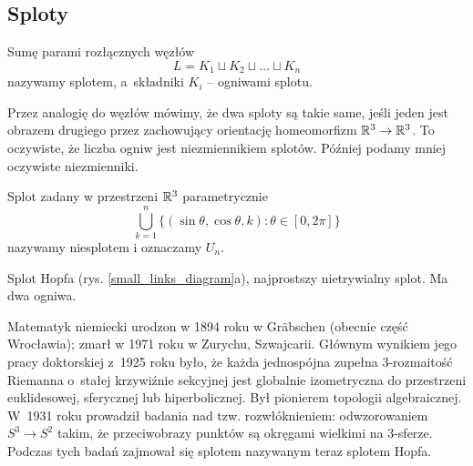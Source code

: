 
\subsection{Sploty}
\begin{definition}
%
    Sumę parami rozłącznych węzłów
    \begin{equation}
        L = K_1 \sqcup K_2 \sqcup \ldots \sqcup K_n
    \end{equation}
    nazywamy splotem, a~składniki $K_i$ -- ogniwami splotu.
\end{definition}

Przez analogię do węzłów mówimy, że dwa sploty są takie same, jeśli jeden jest obrazem drugiego przez zachowujący orientację homeomorfizm $\mathbb R^3 \to \mathbb R^3$.
To oczywiste, że liczba ogniw jest niezmiennikiem splotów.
Później podamy mniej oczywiste niezmienniki.

\begin{example}[niesplot]
%
    Splot zadany w przestrzeni $\mathbb R^3$ parametrycznie
    \begin{equation}
        \bigcup_{k=1}^n \{(\sin \theta, \cos \theta, k) : \theta \in [0, 2\pi]\}
    \end{equation}
    nazywamy niesplotem i oznaczamy $U_n$.
\end{example}
    
\begin{example}
%
%
    Splot Hopfa (rys. \ref{small_links_diagram}a), najprostszy nietrywialny splot. Ma dwa ogniwa.
\end{example}

\begin{remark}
    Matematyk niemiecki urodzon w 1894 roku w Gräbschen (obecnie część Wrocławia); zmarł w 1971 roku w Zurychu, Szwajcarii.
    Głównym wynikiem jego pracy doktorskiej z~1925 roku było, że każda jednospójna zupełna 3-rozmaitość Riemanna o~stałej krzywiźnie sekcyjnej jest globalnie izometryczna do przestrzeni euklidesowej, sferycznej lub hiperbolicznej.
    Był pionierem topologii algebraicznej.
    W~1931 roku prowadził badania nad tzw. rozwłóknieniem: odwzorowaniem $S^3 \to S^2$ takim, że przeciwobrazy punktów są okręgami wielkimi na 3-sferze.
    Podczas tych badań zajmował się splotem nazywanym teraz splotem Hopfa.
\end{remark}

